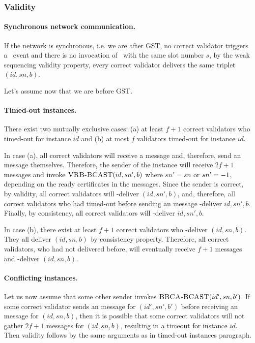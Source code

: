 \subsubsection{Validity}
\label{sec:bbca-validity}
\paragraph{Synchronous network communication.} If the network is synchronous, i.e. we are after GST, no correct validator triggers a \bbcaabort\ event and there is no invocation of \bbcacast\ with the same slot number $s$, by the weak sequencing validity property, every correct validator delivers the same triplet $(id,sn,b)$.

Let's assume now that we are before GST.

\paragraph{Timed-out instances.} 
There exist two mutually exclusive cases: (a) at least $f+1$ correct validators who timed-out for instance $id$ and (b) at most $f$ validators timed-out for instance $id$.

In case (a), all correct validators will receive a \abort message and, therefore, send an \abort message themselves.
Therefore, the sender of the instance will receive $2f+1$ \abort messages and invoke $\textsc{VRB-BCAST}(id, sn', b)$ where  $sn'=sn$ or $sn'=-1$, depending on the ready certificates in the \abort messages.
Since the sender is correct, by \brb validity, all correct validators will \brb-deliver $(id,sn',b)$, and, therefore, all correct validators who had timed-out before sending an \abort message \primitivesmall-deliver $id, sn', b$.
Finally, by \primitive consistency, all correct validators will \primitivesmall-deliver $id, sn', b$.

In case (b), there exist at least $f+1$ correct validators who \primitivesmall-deliver $(id,sn,b)$.
They all deliver $(id,sn,b)$ by \primitive consistency property. 
Therefore, all correct validators, who had not delivered before, will eventually receive $f+1$ \checkpoint messages and \primitivesmall-deliver $(id,sn,b)$.

\paragraph{Conflicting instances.} Let us now assume that some other sender invokes $\textsc{BBCA-BCAST}(id',sn,b')$.
If some correct validator sends an \echo message for $(id',sn',b')$ before receiving an \initiate message for $(id,sn,b)$, then 
it is possible that some correct validators will not gather $2f+1$ \echo messages for $(id,sn,b)$, resulting in a timeout for instance $id$. 
Then validity follows by the same arguments as in timed-out instances paragraph.

